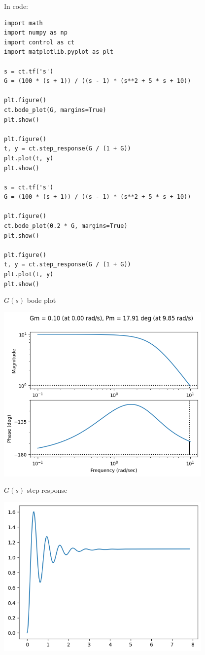 \documentclass[11pt]{article}
\begin{document}
In code:

\begin{verbatim}
import math
import numpy as np
import control as ct
import matplotlib.pyplot as plt

s = ct.tf('s')
G = (100 * (s + 1)) / ((s - 1) * (s**2 + 5 * s + 10))

plt.figure()
ct.bode_plot(G, margins=True)
plt.show()

plt.figure()
t, y = ct.step_response(G / (1 + G))
plt.plot(t, y)
plt.show()

s = ct.tf('s')
G = (100 * (s + 1)) / ((s - 1) * (s**2 + 5 * s + 10))

plt.figure()
ct.bode_plot(0.2 * G, margins=True)
plt.show()

plt.figure()
t, y = ct.step_response(G / (1 + G))
plt.plot(t, y)
plt.show()
\end{verbatim}

$G(s)$ bode plot

\includegraphics[width=300pt]{a5_5.png}

$G(s)$ step response

\includegraphics[width=300pt]{a5_6.png}
\end{document}
